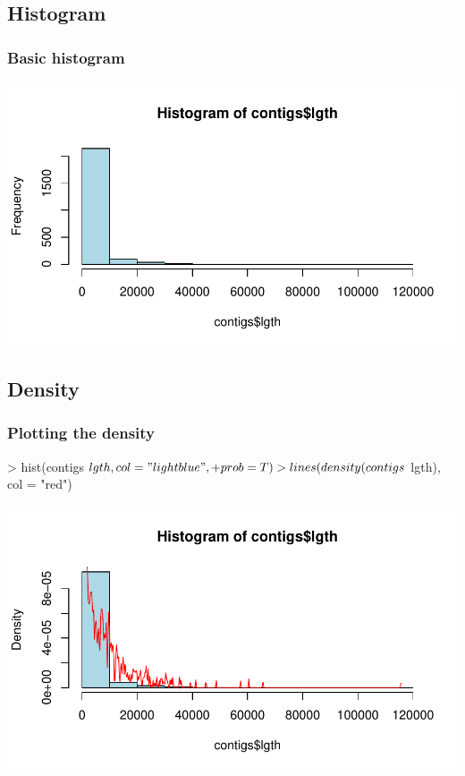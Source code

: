 \subsection{Histogram}

\begin{frame}
  \frametitle{Basic histogram}
\begin{Schunk}
\end{Schunk}
\includegraphics{plots/fig-027}
\end{frame}

\subsection{Density}

\begin{frame}
  \frametitle{Plotting the density}
\begin{Schunk}
\begin{Sinput}
> hist(contigs$lgth, col = "lightblue", 
+     prob = T)
> lines(density(contigs$lgth), col = "red")
\end{Sinput}
\end{Schunk}
\includegraphics{plots/fig-028}
\end{frame}

